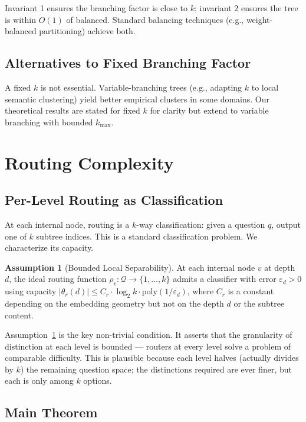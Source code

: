 \documentclass[11pt,a4paper]{article}
\theoremstyle{definition}
\newtheorem{assumption}[theorem]{Assumption}
\theoremstyle{remark}
\newcommand{\Qc}{\mathcal{Q}}
\begin{document}
Invariant 1 ensures the branching factor is close to $k$; invariant 2 ensures the tree is within $O(1)$ of balanced. Standard balancing techniques (e.g., weight-balanced partitioning) achieve both.

\subsection{Alternatives to Fixed Branching Factor}

A fixed $k$ is not essential. Variable-branching trees (e.g., adapting $k$ to local semantic clustering) yield better empirical clusters in some domains. Our theoretical results are stated for fixed $k$ for clarity but extend to variable branching with bounded $k_{\max}$.

\section{Routing Complexity}
\label{sec:routing-complexity}

\subsection{Per-Level Routing as Classification}

At each internal node, routing is a $k$-way classification: given a question $q$, output one of $k$ subtree indices. This is a standard classification problem. We characterize its capacity.

\begin{assumption}[Bounded Local Separability]
\label{assum:sep}
At each internal node $v$ at depth $d$, the ideal routing function $\rho_v: \Qc \to \{1, \ldots, k\}$ admits a classifier with error $\varepsilon_d > 0$ using capacity $|\theta_r(d)| \leq C_r \cdot \log_2 k \cdot \mathrm{poly}(1/\varepsilon_d)$, where $C_r$ is a constant depending on the embedding geometry but not on the depth $d$ or the subtree content.
\end{assumption}

Assumption~\ref{assum:sep} is the key non-trivial condition. It asserts that the granularity of distinction at each level is bounded --- routers at every level solve a problem of comparable difficulty. This is plausible because each level halves (actually divides by $k$) the remaining question space; the distinctions required are ever finer, but each is only among $k$ options.

\subsection{Main Theorem}
\end{document}

